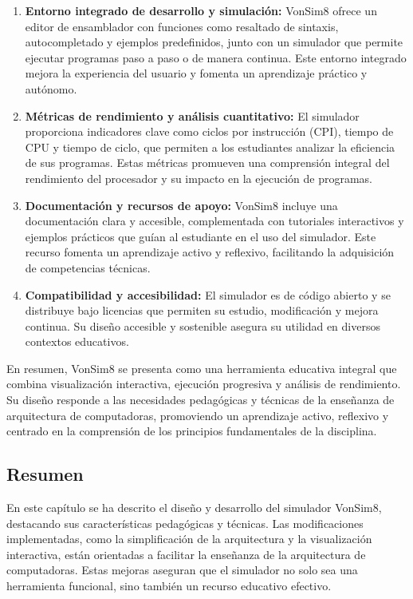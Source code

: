 \documentclass[12pt,oneside]{templates/unerthesis}
\begin{document}
\begin{enumerate}
\item
  \textbf{Entorno integrado de desarrollo y simulación:}
  VonSim8 ofrece un editor de ensamblador con funciones como resaltado de sintaxis, autocompletado y ejemplos predefinidos, junto con un simulador que permite ejecutar programas paso a paso o de manera continua. Este entorno integrado mejora la experiencia del usuario y fomenta un aprendizaje práctico y autónomo.
\item
  \textbf{Métricas de rendimiento y análisis cuantitativo:}
  El simulador proporciona indicadores clave como ciclos por instrucción (CPI), tiempo de CPU y tiempo de ciclo, que permiten a los estudiantes analizar la eficiencia de sus programas. Estas métricas promueven una comprensión integral del rendimiento del procesador y su impacto en la ejecución de programas.
\item
  \textbf{Documentación y recursos de apoyo:}
  VonSim8 incluye una documentación clara y accesible, complementada con tutoriales interactivos y ejemplos prácticos que guían al estudiante en el uso del simulador. Este recurso fomenta un aprendizaje activo y reflexivo, facilitando la adquisición de competencias técnicas.
\item
  \textbf{Compatibilidad y accesibilidad:}
  El simulador es de código abierto y se distribuye bajo licencias que permiten su estudio, modificación y mejora continua. Su diseño accesible y sostenible asegura su utilidad en diversos contextos educativos.
\end{enumerate}

En resumen, VonSim8 se presenta como una herramienta educativa integral que combina visualización interactiva, ejecución progresiva y análisis de rendimiento. Su diseño responde a las necesidades pedagógicas y técnicas de la enseñanza de arquitectura de computadoras, promoviendo un aprendizaje activo, reflexivo y centrado en la comprensión de los principios fundamentales de la disciplina.

\hypertarget{resumen-1}{%
\subsection{Resumen}\label{resumen-1}}

En este capítulo se ha descrito el diseño y desarrollo del simulador VonSim8, destacando sus características pedagógicas y técnicas. Las modificaciones implementadas, como la simplificación de la arquitectura y la visualización interactiva, están orientadas a facilitar la enseñanza de la arquitectura de computadoras. Estas mejoras aseguran que el simulador no solo sea una herramienta funcional, sino también un recurso educativo efectivo.
\end{document}
